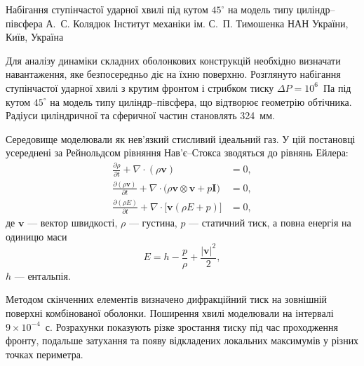 \ReportHeading
  {Набігання ступінчастої ударної хвилі під кутом $45^\circ$ на модель типу циліндр--півсфера}
  {А.~С. Колядюк}
  {Інститут механіки ім. С.~П. Тимошенка НАН України, Київ, Україна}
  {}

Для аналізу динаміки складних оболонкових конструкцій необхідно визначати навантаження, яке безпосередньо діє на їхню поверхню. Розглянуто набігання ступінчастої ударної хвилі з крутим фронтом і стрибком тиску $\Delta P=10^6$~Па під кутом $45^\circ$ на модель типу циліндр--півсфера, що відтворює геометрію обтічника. Радіуси циліндричної та сферичної частин становлять 324~мм.

\begin{center}
\end{center}

Середовище моделювали як нев’язкий стисливий ідеальний газ. У цій постановці усереднені за Рейнольдсом рівняння Нав’є--Стокса зводяться до рівнянь Ейлера:
\begin{align}
 \frac{\partial \rho}{\partial t}+\nabla\!\cdot(\rho\mathbf v)&=0,\\
 \frac{\partial(\rho\mathbf v)}{\partial t}
 +\nabla\!\cdot\bigl(\rho\mathbf v\otimes\mathbf v+p\mathbf I\bigr)&=0,\\
 \frac{\partial(\rho E)}{\partial t}
 +\nabla\!\cdot\bigl[\mathbf v(\rho E+p)\bigr]&=0,
\end{align}
де $\mathbf v$ --- вектор швидкості, $\rho$ --- густина, $p$ --- статичний тиск, а повна енергія на одиницю маси
\[
 E=h-\frac{p}{\rho}+\frac{|\mathbf v|^2}{2},
\]
$h$ --- ентальпія.

Методом скінченних елементів визначено дифракційний тиск на зовнішній поверхні комбінованої оболонки. Поширення хвилі моделювали на інтервалі $9\times10^{-4}$~с. Розрахунки показують різке зростання тиску під час проходження фронту, подальше затухання та появу відкладених локальних максимумів у різних точках периметра.

